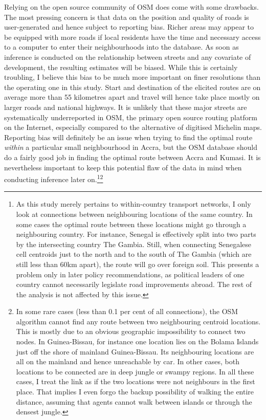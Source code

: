 \documentclass[11pt, oneside]{article}   	%
\begin{document}
Relying on the open source community of OSM does come with some drawbacks. The most pressing concern is that data on the position and quality of roads is user-generated and hence subject to reporting bias. Richer areas may appear to be equipped with more roads if local residents have the time and necessary access to a computer to enter their neighbourhoods into the database. As soon as inference is conducted on the relationship between streets and any covariate of development, the resulting estimates will be biased. While this is certainly troubling, I believe this bias to be much more important on finer resolutions than the operating one in this study. Start and destination of the elicited routes are on average more than 55 kilometres apart and travel will hence take place mostly on larger roads and national highways. It is unlikely that these major streets are systematically underreported in OSM, the primary open source routing platform on the Internet, especially compared to the alternative of digitised Michelin maps. Reporting bias will definitely be an issue when trying to find the optimal route \emph{within} a particular small neighbourhood in Accra, but the OSM database should do a fairly good job in finding the optimal route between Accra and Kumasi. It is nevertheless important to keep this potential flaw of the data in mind when conducting inference later on.\footnote{As this study merely pertains to within-country transport networks, I only look at connections between neighbouring locations of the same country. In some cases the optimal route between these locations might go through a neighbouring country. For instance, Senegal is effectively split into two parts by the intersecting country The Gambia. Still, when connecting Senegalese cell centroids just to the north and to the south of The Gambia (which are still less than 60km apart), the route will go over foreign soil. This presents a problem only in later policy recommendations, as political leaders of one country cannot necessarily legislate road improvements abroad. The rest of the analysis is not affected by this issue.}\footnote{In some rare cases (less than 0.1 per cent of all connections), the OSM algorithm cannot find any route between two neighbouring centroid locations. This is mostly due to an obvious geographic impossibility to connect two nodes. In Guinea-Bissau, for instance one location lies on the Bolama Islands just off the shore of mainland Guinea-Bissau. Its neighbouring locations are all on the mainland and hence unreachable by car. In other cases, both locations to be connected are in deep jungle or swampy regions. In all these cases, I treat the link as if the two locations were not neighbours in the first place. That implies I even forgo the backup possibility of walking the entire distance, assuming that agents cannot walk between islands or through the densest jungle.}
\end{document}
